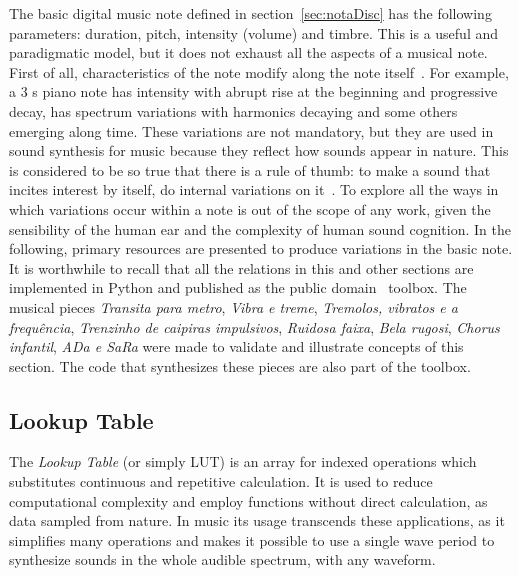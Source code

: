 The basic digital music note defined in section~\ref{sec:notaDisc} has the following parameters: duration, pitch, intensity (volume) and timbre. This is a useful and paradigmatic model, but it does not exhaust all the aspects of a musical note. First of all, characteristics of the note modify along the note itself~\cite{Chowning}. For example, a 3 s piano note has intensity with abrupt rise at the beginning and progressive decay, has spectrum variations with harmonics decaying and some others emerging along time. These variations are not mandatory, but they are used in sound synthesis for music because they reflect how sounds appear in nature. This is considered to be so true that there is a rule of thumb: to make a sound that incites interest by itself, do internal variations on it~\cite{Roederer}.
To explore all the ways in which variations occur within a note is out of the scope of any work, given the sensibility of the human ear and the complexity of human sound cognition. In the following, primary resources are presented to produce variations in the basic note. It is worthwhile to recall that all the relations in this and other sections are implemented in Python and published as the public domain \massa\ toolbox. The musical pieces \emph{Transita para metro}, \emph{Vibra e treme}, \emph{Tremolos, vibratos e a frequência}, \emph{Trenzinho de caipiras impulsivos}, \emph{Ruidosa faixa}, \emph{Bela rugosi}, \emph{Chorus infantil}, \emph{ADa e SaRa} were made to validate and illustrate concepts of this section. The code that synthesizes these pieces are also part of the toolbox\cite{MASSA}.
 
\subsection{Lookup Table}\label{subsec:lookup}

The \emph{Lookup Table} (or simply LUT) is an array for indexed operations which substitutes continuous and repetitive calculation. It is used to reduce computational complexity and employ functions without direct calculation, as data sampled from nature.
In music its usage transcends these applications, as it simplifies many operations and makes it possible to use a single wave period to synthesize sounds in the whole audible spectrum, with any waveform.

